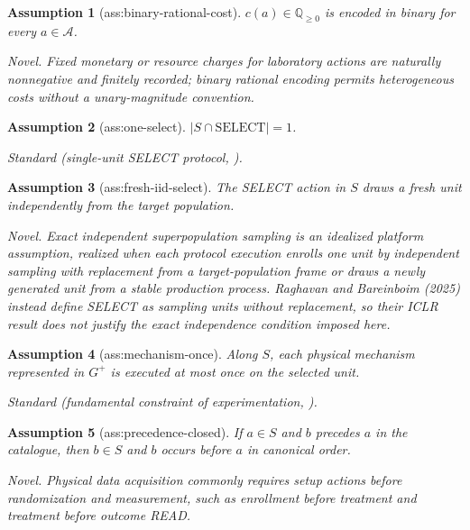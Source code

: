 \documentclass{article}
\newtheorem{assumption}{Assumption}
\begin{document}
\begin{assumption}[ass:binary-rational-cost]\label{ass:binary-rational-cost}
\(c(a)\in\mathbb Q_{\ge0}\) is encoded in binary for every \(a\in\mathcal A\).
\par\smallskip\noindent\emph{Novel.} Fixed monetary or resource charges for laboratory actions are naturally nonnegative and finitely recorded; binary rational encoding permits heterogeneous costs without a unary-magnitude convention.
\end{assumption}

\begin{assumption}[ass:one-select]\label{ass:one-select}
\(|S\cap\mathrm{SELECT}|=1\).
\par\smallskip\noindent\emph{Standard} (single-unit SELECT protocol, \cite{RaghavanBareinboim2025Realizability}).
\end{assumption}

\begin{assumption}[ass:fresh-iid-select]\label{ass:fresh-iid-select}
The SELECT action in \(S\) draws a fresh unit independently from the target population.
\par\smallskip\noindent\emph{Novel.} Exact independent superpopulation sampling is an idealized platform assumption, realized when each protocol execution enrolls one unit by independent sampling with replacement from a target-population frame or draws a newly generated unit from a stable production process. Raghavan and Bareinboim (2025) instead define SELECT as sampling units without replacement, so their ICLR result does not justify the exact independence condition imposed here.
\end{assumption}

\begin{assumption}[ass:mechanism-once]\label{ass:mechanism-once}
Along \(S\), each physical mechanism represented in \(G^{+}\) is executed at most once on the selected unit.
\par\smallskip\noindent\emph{Standard} (fundamental constraint of experimentation, \cite{RaghavanBareinboim2025Realizability}).
\end{assumption}

\begin{assumption}[ass:precedence-closed]\label{ass:precedence-closed}
If \(a\in S\) and \(b\) precedes \(a\) in the catalogue, then \(b\in S\) and \(b\) occurs before \(a\) in canonical order.
\par\smallskip\noindent\emph{Novel.} Physical data acquisition commonly requires setup actions before randomization and measurement, such as enrollment before treatment and treatment before outcome READ.
\end{assumption}
\end{document}
